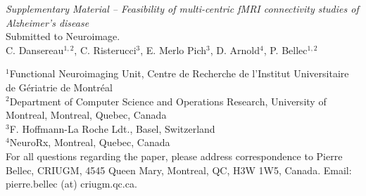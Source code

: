 \documentclass[authoryear]{elsarticle}
\begin{document}
\clearpage
\appendix


\clearpage
\pagebreak
\renewcommand{\thefigure}{S\arabic{figure}}
\renewcommand{\thetable}{S\arabic{table}}
\setcounter{figure}{0}
\begin{center}
\emph{Supplementary Material {--} Feasibility of multi-centric fMRI connectivity studies of Alzheimer's disease}\\

\vspace{\baselineskip}Submitted to Neuroimage.\\

\vspace{\baselineskip}C. Dansereau$^{1,2}$,  C. Risterucci$^{3}$, E. Merlo Pich$^{3}$, D. Arnold$^{4}$, P. Bellec$^{1,2}$\\

\end{center}
$^1$Functional Neuroimaging Unit, Centre de Recherche de l'Institut Universitaire de G\'eriatrie de Montr\'eal\\
$^2$Department of Computer Science and Operations Research, University of Montreal, Montreal, Quebec, Canada\\
$^3$F. Hoffmann-La Roche Ldt., Basel, Switzerland\\
$^4$NeuroRx, Montreal, Quebec, Canada\\

For all questions regarding the paper, please address correspondence to Pierre Bellec, CRIUGM, 4545 Queen Mary, Montreal, QC, H3W 1W5, Canada. Email: pierre.bellec (at) criugm.qc.ca.\\
\end{document}
